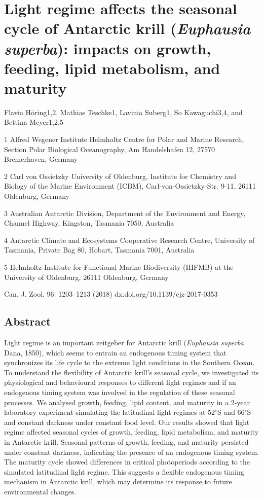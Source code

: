 \chapter{Light regime affects the seasonal cycle of Antarctic krill (\textit{Euphausia superba}): impacts on growth, feeding, lipid metabolism, and maturity}

Flavia Höring1,2, Mathias Teschke1, Lavinia Suberg1, So Kawaguchi3,4, and Bettina Meyer1,2,5

1 Alfred Wegener Institute Helmholtz Centre for Polar and Marine Research, Section Polar Biological Oceanography, Am Handelshafen 12, 27570 Bremerhaven, Germany

2 Carl von Ossietzky University of Oldenburg, Institute for Chemistry and Biology of the Marine Environment (ICBM), Carl-von-Ossietzky-Str. 9-11, 26111 Oldenburg, Germany

3 Australian Antarctic Division, Department of the Environment and Energy, Channel Highway, Kingston, Tasmania 7050, Australia

4 Antarctic Climate and Ecosystems Cooperative Research Centre, University of Tasmania, Private Bag 80, Hobart, Tasmania 7001, Australia

5 Helmholtz Institute for Functional Marine Biodiversity (HIFMB) at the University of Oldenburg, 26111 Oldenburg, Germany 

Can. J. Zool. 96: 1203–1213 (2018) dx.doi.org/10.1139/cjz-2017-0353 
 
\section{Abstract}
Light regime is an important zeitgeber for Antarctic krill (\textit{Euphausia superba} Dana, 1850), which seems to entrain an endogenous timing system that synchronizes its life cycle to the extreme light conditions in the Southern Ocean. To understand the flexibility of Antarctic krill’s seasonal cycle, we investigated its physiological and behavioural responses to different light regimes and if an endogenous timing system was involved in the regulation of these seasonal processes. We analysed growth, feeding, lipid content, and maturity in a 2-year laboratory experiment simulating the latitudinal light regimes at 52$^{\circ}$S and 66$^{\circ}$S and constant darkness under constant food level. Our results showed that light regime affected seasonal cycles of growth, feeding, lipid metabolism, and maturity in Antarctic krill. Seasonal patterns of growth, feeding, and maturity persisted under constant darkness, indicating the presence of an endogenous timing system. The maturity cycle showed differences in critical photoperiods according to the simulated latitudinal light regime. This suggests a flexible endogenous timing mechanism in Antarctic krill, which may determine its response to future environmental changes. 
 
